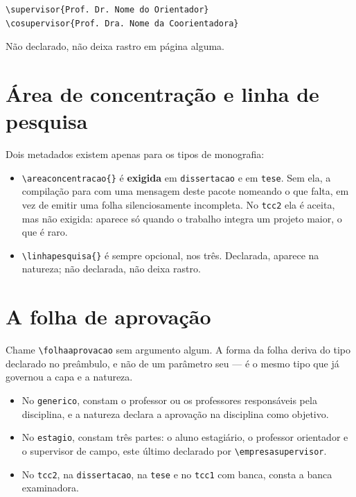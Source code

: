 \begin{Verbatim}[fontsize=\small]
\supervisor{Prof. Dr. Nome do Orientador}
\cosupervisor{Prof. Dra. Nome da Coorientadora}
\end{Verbatim}

Não declarado, não deixa rastro em página alguma.

\section{Área de concentração e linha de pesquisa}\label{sec:area-linha}

Dois metadados existem apenas para os tipos de monografia:

\begin{itemize}
    \item \verb|\areaconcentracao{}| é \textbf{exigida} em \texttt{dissertacao} e em \texttt{tese}.
          Sem ela, a compilação para com uma mensagem deste pacote nomeando o que falta, em vez de
          emitir uma folha silenciosamente incompleta. No \texttt{tcc2} ela é aceita, mas não
          exigida: aparece só quando o trabalho integra um projeto maior, o que é raro.
    \item \verb|\linhapesquisa{}| é sempre opcional, nos três. Declarada, aparece na natureza; não
          declarada, não deixa rastro.
\end{itemize}

\section{A folha de aprovação}\label{sec:folha-aprovacao}

Chame \verb|\folhaaprovacao| sem argumento algum. A forma da folha deriva do tipo declarado no
preâmbulo, e não de um parâmetro seu --- é o mesmo tipo que já governou a capa e a natureza.

\begin{itemize}
    \item No \texttt{generico}, constam o professor ou os professores responsáveis pela disciplina,
          e a natureza declara a aprovação na disciplina como objetivo.
    \item No \texttt{estagio}, constam três partes: o aluno estagiário, o professor orientador e o
          supervisor de campo, este último declarado por \verb|\empresasupervisor|.
    \item No \texttt{tcc2}, na \texttt{dissertacao}, na \texttt{tese} e no \texttt{tcc1} com banca,
          consta a banca examinadora.
\end{itemize}

